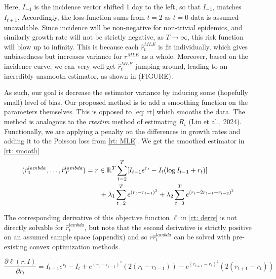 \documentclass[12pt]{article}
\let\argmin\relax\DeclareMathOperator*{\argmin}{argmin}
\begin{document}
      Here, $I_{-1}$ is the incidence vector shifted 1 day to the left, so that ${I_{-1}}_t$ matches $I_{t + 1}$. 
      Accordingly, the loss function sums from $t = 2$ as $t = 0$ data is assumed unavailable.
      Since incidence will be non-negative for non-trivial epidemics, and similarly growth rate will not be strictly negative, as $T \to \infty$, 
      this risk function will blow up to infinity. This is because each $\hat{r}_t^{MLE}$ is fit individually, 
      which gives unbiasedness but increases variance for $r^{MLE}$ as a whole. Moreover, based on the incidence curve, we can very well get $\hat{r}_t^{MLE}$ jumping around, 
      leading to an incredibly unsmooth estimator, as shown in (FIGURE). 
      
      As such, our goal is decrease the estimator variance by inducing some (hopefully small) level of bias. 
      Our proposed method is to add a smoothing function on the parameters themselves. This is opposed to 
      \cref{eq: rt} which smooths the data. The method is analogous to the \textit{rtestim} method of estimating $R_t$ (Liu et al., 2024).
      Functionally, we are applying a penalty on the differences in growth rates and adding it to the Poisson loss
      from \cref{rt: MLE}. We get the smoothed estimator in \cref{rt: smooth}
      \begin{align} \label{rt: smooth}
          (\hat{r}_1^{lambda},\dots,\hat{r}_T^{lambda}) &= \argmin{r \in \mathbb{R}^T} \sum_{t = 2}^T [I_{t - 1}e^{r_t} - I_t(\log{I_{t - 1}} + r_t)] \\
          &\qquad + \lambda_1 \sum_{t = 2}^T e^{(r_t - r_{t - 1})^2} + \lambda_2 \sum_{t = 3}^T e^{(r_t - 2r_{t - 1} + r_{t -2})^2}
      \end{align}

      The corresponding derivative of this objective function $\ell$ in \cref{rt: deriv} is not directly solvable for $\hat{r}_t^{lambda}$, 
      but note that the second derivative is strictly positive on an assumed sample space (appendix) and so $r\hat{r}_t^{lambda}$ can be solved
      with pre-existing convex optimization methods. 

      \begin{equation} \label{rt: deriv}
          \frac{\partial \ell(r; I)}{\partial r_t} = I_{t - 1}e^{r_t} - I_t + e^{(r_t - r_{t - 1})^2} (2(r_t - r_{t - 1})) 
          - e^{(r_{t+1} - r_{t})^2} (2(r_{t+1} - r_{t}))
      \end{equation}
\end{document}
